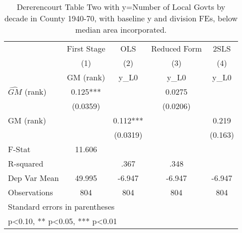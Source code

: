 \begin{table}[htbp]\centering
\def\sym#1{\ifmmode^{#1}\else\(^{#1}\)\fi}
\caption{Dererencourt Table Two with y=Number of Local Govts by decade in County 1940-70, with baseline y and division FEs, below median area incorporated.}
\begin{tabular}{l*{4}{c}}
\toprule
                    & First Stage   &         OLS   &Reduced Form   &        2SLS   \\
                    &\multicolumn{1}{c}{(1)}&\multicolumn{1}{c}{(2)}&\multicolumn{1}{c}{(3)}&\multicolumn{1}{c}{(4)}\\
                    &\multicolumn{1}{c}{GM  (rank)}&\multicolumn{1}{c}{y\_L0}&\multicolumn{1}{c}{y\_L0}&\multicolumn{1}{c}{y\_L0}\\
\midrule
$\hat{GM}$ (rank)   &       0.125***&               &      0.0275   &               \\
                    &    (0.0359)   &               &    (0.0206)   &               \\
\addlinespace
GM  (rank)          &               &       0.112***&               &       0.219   \\
                    &               &    (0.0319)   &               &     (0.163)   \\
\midrule
F-Stat              &      11.606   &               &               &               \\
R-squared           &               &        .367   &        .348   &               \\
Dep Var Mean        &      49.995   &      -6.947   &      -6.947   &      -6.947   \\
Observations        &         804   &         804   &         804   &         804   \\
\bottomrule
\multicolumn{5}{l}{\footnotesize Standard errors in parentheses}\\
\multicolumn{5}{l}{\footnotesize * p<0.10, ** p<0.05, *** p<0.01}\\
\end{tabular}
\end{table}

